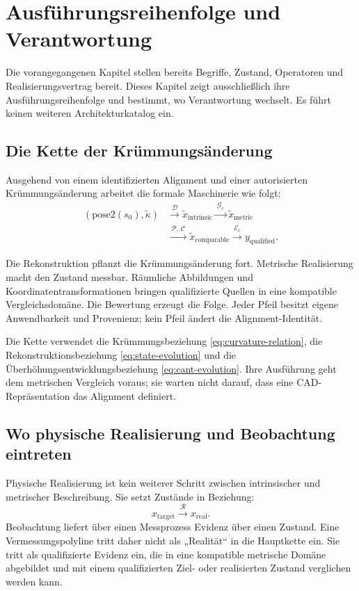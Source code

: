 
\chapter{Ausführungsreihenfolge und Verantwortung}
\label{chap:system-layers}

Die vorangegangenen Kapitel stellen bereits Begriffe, Zustand, Operatoren und
Realisierungsvertrag bereit. Dieses Kapitel zeigt ausschließlich ihre
Ausführungsreihenfolge und bestimmt, wo Verantwortung wechselt. Es führt
keinen weiteren Architekturkatalog ein.

\section{Die Kette der Krümmungsänderung}

Ausgehend von einem identifizierten Alignment und einer autorisierten
Krümmungsänderung arbeitet die formale Maschinerie wie folgt:
\[
\begin{aligned}
(\mathrm{pose2}(s_0),\widetilde\kappa)
&\xrightarrow{\ \mathcal D\ }
\widetilde x_{\mathrm{intrinsic}}
\xrightarrow{\ \mathcal G_c\ }
\widetilde x_{\mathrm{metric}}\\
&\xrightarrow{\ \mathcal P,\,\mathcal C\ }
\widetilde x_{\mathrm{comparable}}
\xrightarrow{\ \mathcal E_c\ }
y_{\mathrm{qualified}}.
\end{aligned}
\]

Die Rekonstruktion pflanzt die Krümmungsänderung fort. Metrische Realisierung
macht den Zustand messbar. Räumliche Abbildungen und
Koordinatentransformationen bringen qualifizierte Quellen in eine kompatible
Vergleichsdomäne. Die Bewertung erzeugt die Folge. Jeder Pfeil besitzt eigene
Anwendbarkeit und Provenienz; kein Pfeil ändert die Alignment-Identität.

Die Kette verwendet die Krümmungsbeziehung
\cref{eq:curvature-relation}, die Rekonstruktionsbeziehung
\cref{eq:state-evolution} und die Überhöhungsentwicklungsbeziehung
\cref{eq:cant-evolution}. Ihre Ausführung geht dem metrischen Vergleich
voraus; sie warten nicht darauf, dass eine CAD-Repräsentation das Alignment
definiert.

\section{Wo physische Realisierung und Beobachtung eintreten}

Physische Realisierung ist kein weiterer Schritt zwischen intrinsischer und
metrischer Beschreibung. Sie setzt Zustände in Beziehung:
\[
x_{\mathrm{target}}
\xrightarrow{\ \mathcal R\ }
x_{\mathrm{real}}.
\]
Beobachtung liefert über einen Messprozess Evidenz über einen Zustand. Eine
Vermessungspolyline tritt daher nicht als „Realität“ in die Hauptkette ein.
Sie tritt als qualifizierte Evidenz ein, die in eine kompatible metrische
Domäne abgebildet und mit einem qualifizierten Ziel- oder realisierten Zustand
verglichen werden kann.

